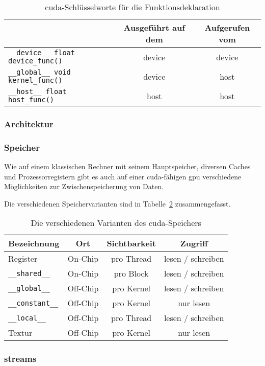 \begin{table}
    \centering
    \begin{tabular}{| l | c | c |}
        \hline
        & Ausgeführt auf dem & Aufgerufen vom \\
        \hline
        \texttt{\_\_device\_\_ float device\_func()} & \gls{device} & \gls{device} \\
        \hline
        \texttt{\_\_global\_\_ void kernel\_func()} & \gls{device} & \gls{host} \\
        \hline
        \texttt{\_\_host\_\_ float host\_func()} & \gls{host} & \gls{host} \\
        \hline
    \end{tabular}
    \caption{\gls{cuda}-Schlüsselworte für die Funktionsdeklaration}
    \label{table:cu_func_keywords}
\end{table}

\subsubsection{Architektur}\label{sssec:cu_arch}

\subsubsection{Speicher}\label{sssec:cu_mem}

Wie auf einem klassischen Rechner mit seinem Hauptspeicher, diversen Caches und Prozessorregistern gibt es auch auf
einer \gls{cuda}-fähigen \gls{gpu} verschiedene Möglichkeiten zur Zwischenspeicherung von Daten.

Die verschiedenen Speichervarianten sind in Tabelle~\ref{table:cu_mem_hierarchie} zusammengefasst.

\begin{table}
    \centering
    \begin{tabular}{| l | c | c | c |}
        \hline
        Bezeichnung & Ort & Sichtbarkeit & Zugriff\\
        \hline
        \hline
        Register & On-Chip & pro Thread & lesen / schreiben \\
        \hline
        \texttt{\_\_shared\_\_} & On-Chip & pro Block & lesen / schreiben \\
        \hline
        \texttt{\_\_global\_\_} & Off-Chip & pro Kernel & lesen / schreiben \\
        \hline
        \texttt{\_\_constant\_\_} & Off-Chip & pro Kernel & nur lesen \\
        \hline
        \texttt{\_\_local\_\_} & Off-Chip & pro Thread & lesen / schreiben\\
        \hline
        Textur & Off-Chip & pro Kernel & nur lesen\\
        \hline
    \end{tabular}
    \caption{Die verschiedenen Varianten des \gls{cuda}-Speichers}
    \label{table:cu_mem_hierarchie}
\end{table}

\subsubsection{\glspl{stream}}\label{sssec:cu_streams}

